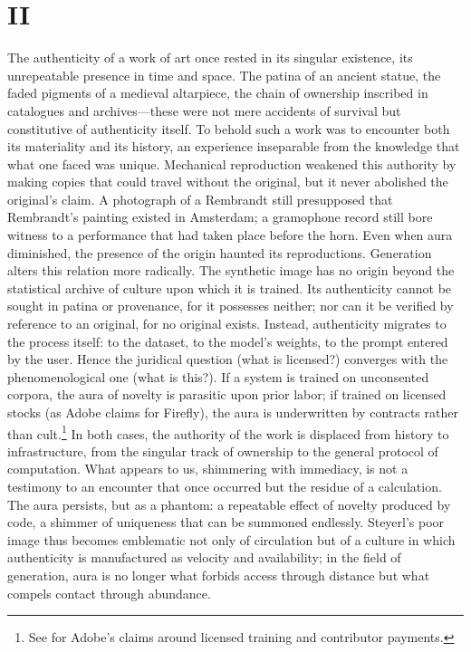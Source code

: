 \documentclass[12pt]{article}
\begin{document}
\section*{II}

The authenticity of a work of art once rested in its singular existence, its unrepeatable presence in time and space. The patina of an ancient statue, the faded pigments of a medieval altarpiece, the chain of ownership inscribed in catalogues and archives---these were not mere accidents of survival but constitutive of authenticity itself. To behold such a work was to encounter both its materiality and its history, an experience inseparable from the knowledge that what one faced was unique. Mechanical reproduction weakened this authority by making copies that could travel without the original, but it never abolished the original's claim. A photograph of a Rembrandt still presupposed that Rembrandt's painting existed in Amsterdam; a gramophone record still bore witness to a performance that had taken place before the horn. Even when aura diminished, the presence of the origin haunted its reproductions. Generation alters this relation more radically. The synthetic image has no origin beyond the statistical archive of culture upon which it is trained. Its authenticity cannot be sought in patina or provenance, for it possesses neither; nor can it be verified by reference to an original, for no original exists. Instead, authenticity migrates to the process itself: to the dataset, to the model's weights, to the prompt entered by the user. Hence the juridical question (what is licensed?) converges with the phenomenological one (what is this?). If a system is trained on unconsented corpora, the aura of novelty is parasitic upon prior labor; if trained on licensed stocks (as Adobe claims for Firefly), the aura is underwritten by contracts rather than cult.\footnote{See \autocite{Adobe2023} for Adobe's claims around licensed training and contributor payments.} In both cases, the authority of the work is displaced from history to infrastructure, from the singular track of ownership to the general protocol of computation. What appears to us, shimmering with immediacy, is not a testimony to an encounter that once occurred but the residue of a calculation. The aura persists, but as a phantom: a repeatable effect of novelty produced by code, a shimmer of uniqueness that can be summoned endlessly. Steyerl's poor image thus becomes emblematic not only of circulation\autocite{Steyerl2013} but of a culture in which authenticity is manufactured as velocity and availability; in the field of generation, aura is no longer what forbids access through distance but what compels contact through abundance.
\end{document}
